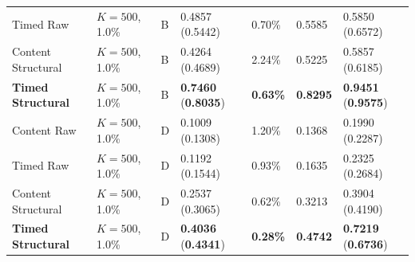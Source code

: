 \documentclass[12pt, a4paper, reqno, oneside]{book}
\begin{document}
{\begin{longtable}{P{2.8cm}P{1.7cm}P{0.7cm}P{2.1cm}P{1.5cm}P{1.4cm}P{2.1cm}}
Timed Raw & $K=500$, 1.0\% & B & 0.4857 (0.5442) & 0.70\% & 0.5585 & 0.5850 (0.6572)\\
Content Structural & $K=500$, 1.0\% & B & 0.4264 (0.4689) & 2.24\% & 0.5225 & 0.5857 (0.6185)\\
\textbf{Timed Structural} & $K=500$, 1.0\% & B & \textbf{0.7460} (\textbf{0.8035}) & \textbf{0.63\%} & \textbf{0.8295} & \textbf{0.9451} (\textbf{0.9575})\\
Content Raw & $K=500$, 1.0\% & D & 0.1009 (0.1308) & 1.20\% & 0.1368 & 0.1990 (0.2287)\\
Timed Raw & $K=500$, 1.0\% & D & 0.1192 (0.1544) & 0.93\% & 0.1635 & 0.2325 (0.2684)\\
Content Structural & $K=500$, 1.0\% & D & 0.2537 (0.3065) & 0.62\% & 0.3213 & 0.3904 (0.4190)\\
\textbf{Timed Structural} & $K=500$, 1.0\% & D & \textbf{0.4036} (\textbf{0.4341}) & \textbf{0.28\%} & \textbf{0.4742} & \textbf{0.7219} (\textbf{0.6736})\\
\bottomrule
\end{longtable}}
\end{document}
